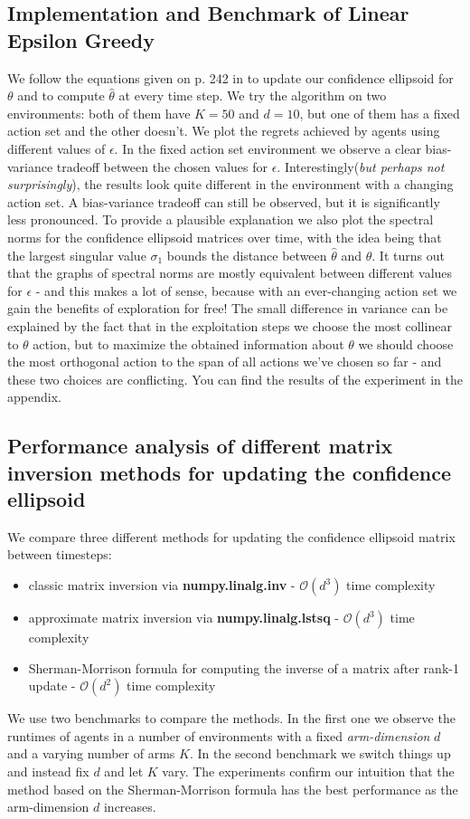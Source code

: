 \subsection{Implementation and Benchmark of Linear Epsilon Greedy}
We follow the equations given on p. 242 in \cite{lattimore2020bandit} to update our confidence ellipsoid for $\theta$
and to compute $\hat{\theta}$ at every time step. We try the algorithm on two environments: both of them have $K=50$ and $d=10$,
but one of them has a fixed action set and the other doesn't. We plot the regrets achieved by agents using different values of $\epsilon$.
In the fixed action set environment we observe a clear bias-variance tradeoff between the chosen values for $\epsilon$. 
Interestingly(\emph{but perhaps not surprisingly}), the results look quite different in the environment with a changing action set. A bias-variance
tradeoff can still be observed, but it is significantly less pronounced. To provide a plausible explanation we also plot the spectral norms for the
confidence ellipsoid matrices over time, with the idea being that the largest singular value $\sigma_1$ bounds the distance between $\hat{\theta}$
and $\theta$. It turns out that the graphs of spectral norms are mostly equivalent between different values for $\epsilon$ - and this makes a lot of sense, 
because with an ever-changing action set we gain the benefits of exploration for free! The small difference in variance can be explained by the fact that
in the exploitation steps we choose the most collinear to $\theta$ action, but to maximize the obtained information about $\theta$ we should choose the most
orthogonal action to the span of all actions we've chosen so far - and these two choices are conflicting. You can find the results of the experiment in the
appendix.

\subsection{Performance analysis of different matrix inversion methods for updating the confidence ellipsoid}
We compare three different methods for updating the confidence ellipsoid matrix between timesteps:
\begin{itemize}
  \item classic matrix inversion via \textbf{numpy.linalg.inv} - $\mathcal{O}(d^3)$ time complexity
  \item approximate matrix inversion via \textbf{numpy.linalg.lstsq} - $\mathcal{O}(d^3)$ time complexity
  \item Sherman-Morrison formula for computing the inverse of a matrix after rank-1 update - $\mathcal{O}(d^2)$ time complexity
\end{itemize}
We use two benchmarks to compare the methods. In the first one we observe the runtimes of agents in a number of environments
with a fixed \textit{arm-dimension} $d$ and a varying number of arms $K$. In the second benchmark we switch things up and instead fix $d$
and let $K$ vary. The experiments confirm our intuition that the method based on the Sherman-Morrison formula has the best performance as the
arm-dimension $d$ increases.

